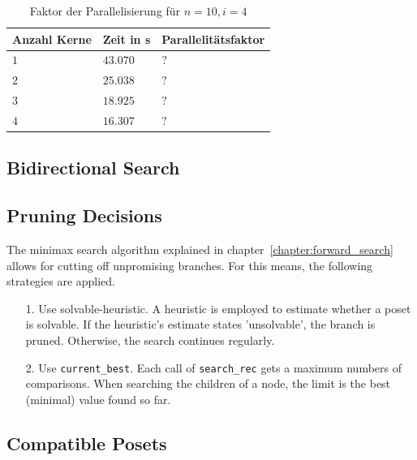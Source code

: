 \documentclass[10pt,journal,compsoc]{IEEEtran}
\begin{document}
\begin{table}
  \begin{tabular}{l|l|l}
    Anzahl Kerne & Zeit in s & Parallelitätsfaktor \\
    \hline
    $1$          & $43.070$  & $?$                 \\ %
    $2$          & $25.038$  & $?$                 \\
    $3$          & $18.925$  & $?$                 \\
    $4$          & $16.307$  & $?$                 \\
  \end{tabular}
  \centering
  \caption{Faktor der Parallelisierung für $n = 10, i = 4$}
  \label{table:backward-parallel}
\end{table}


\subsection{Bidirectional Search}

\subsection{Pruning Decisions}
The minimax search algorithm explained in chapter~\ref{chapter:forward_search} allows for cutting off unpromising branches. For this means, the following strategies are applied.

\begin{enumerate}
  \item[1.]
    Use solvable-heuristic. A heuristic is employed to estimate whether a poset is solvable. If the heuristic's estimate states 'unsolvable', the branch is pruned.
    Otherwise, the search continues regularly.
  \item[2.]
    Use \texttt{current\_best}. Each call of \texttt{search\_rec} gets a maximum numbers of comparisons.
    When searching the children of a node, the limit is the best (minimal) value found so far.

\end{enumerate}

\subsection{Compatible Posets}
\end{document}
